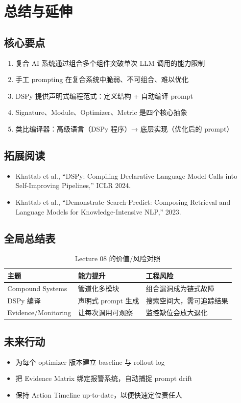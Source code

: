 \section{总结与延伸}

\subsection{核心要点}

\begin{enumerate}
    \item 复合 AI 系统通过组合多个组件突破单次 LLM 调用的能力限制
    \item 手工 prompting 在复合系统中脆弱、不可组合、难以优化
    \item DSPy 提供声明式编程范式：定义结构 + 自动编译 prompt
    \item Signature、Module、Optimizer、Metric 是四个核心抽象
    \item 类比编译器：高级语言（DSPy 程序）→ 底层实现（优化后的 prompt）
\end{enumerate}

\subsection{拓展阅读}

\begin{itemize}
    \item Khattab et al., ``DSPy: Compiling Declarative Language Model Calls into Self-Improving Pipelines,'' ICLR 2024.
    \item Khattab et al., ``Demonstrate-Search-Predict: Composing Retrieval and Language Models for Knowledge-Intensive NLP,'' 2023.
\end{itemize}

\subsection{全局总结表}

\begin{table}[H]
\centering
\begin{tabular}{p{}p{}p{}}
\toprule
主题 & 能力提升 & 工程风险 \\
\midrule
Compound Systems & 管道化多模块 & 组合漏洞成为链式故障 \\
DSPy 编译 & 声明式 prompt 生成 & 搜索空间大，需可追踪结果 \\
Evidence/Monitoring & 让每次调用可观察 & 监控缺位会放大退化 \\
\bottomrule
\end{tabular}
\caption{Lecture 08 的价值/风险对照}
\end{table}

\subsection{未来行动}

\begin{itemize}
    \item 为每个 optimizer 版本建立 baseline 与 rollout log
    \item 把 Evidence Matrix 绑定报警系统，自动捕捉 prompt drift
    \item 保持 Action Timeline up-to-date，以便快速定位责任人
\end{itemize}



